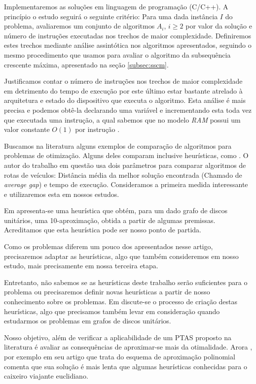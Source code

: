Implementaremos as soluções em linguagem de programação (C/C++). A princípio o estudo seguirá o seguinte critério: Para uma dada instância $I$ do problema, avaliaremos um conjunto de algoritmos $A_i$, $i \geq 2$ por valor da solução e número de instruções executadas nos trechos de maior complexidade. Definiremos estes trechos mediante análise assintótica nos algoritmos apresentados, seguindo o mesmo procedimento que usamos para avaliar o algoritmo da subsequência crescente máxima, apresentado na seção \ref{subsec:sscm}.

Justificamos contar o número de instruções nos trechos de maior complexidade em detrimento do tempo de execução por este último estar bastante atrelado à arquitetura e estado do dispositivo que executa o algoritmo. Esta análise é mais precisa e podemos obtê-la declarando uma variável e incrementando esta toda vez que executada uma instrução, a qual sabemos que no modelo \textit{RAM} possui um valor constante $O(1)$ por instrução \cite{arora1998polynomial}.

Buscamos na literatura alguns exemplos de comparação de algoritmos para problemas de otimização. Alguns deles comparam inclusive heurísticas, como \cite{ropke2005heuristic}. O autor do trabalho em questão usa dois parâmetros para comparar algoritmos de rotas de veículos: Distância média da melhor solução encontrada (Chamado de \textit{average gap}) e tempo de execução. Consideramos a primeira medida interessante e utilizaremos esta em nossos estudos.

Em \cite{marathe1995simple} apresenta-se uma heurística que obtém, para um dado grafo de discos unitários, uma 10-aproximação, obtida a partir de algumas premissas. Acreditamos que esta heurística pode ser nosso ponto de partida.

Como os problemas diferem um pouco dos apresentados nesse artigo, precisaremos adaptar as heurísticas, algo que também consideremos em nosso estudo, mais precisamente em nossa terceira etapa.

Entretanto, não sabemos se as heurísticas deste trabalho serão suficientes para o problema ou precisaremos definir novas heurísticas a partir de nosso conhecimento sobre os problemas. Em \cite{lenat} discute-se o processo de criação destas heurísticas, algo que precisamos também levar em consideração quando estudarmos os problemas em grafos de discos unitários.

Nosso objetivo, além de verificar a aplicabilidade de um PTAS proposto na literatura é avaliar as consequências de aproximar-se mais da otimalidade. Arora \cite{arora1998polynomial}, por exemplo em seu artigo que trata do esquema de aproximação polinomial comenta que sua solução é mais lenta que algumas heurísticas conhecidas para o caixeiro viajante euclidiano. 

